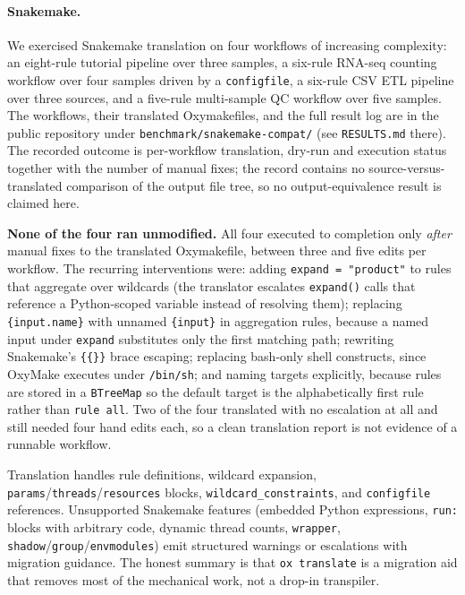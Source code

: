 \documentclass[12pt,a4paper]{article}
\newcommand{\code}[1]{{\texttt{\small\color{inlinecode}#1}}}
\begin{document}
\paragraph{Snakemake.}
We exercised Snakemake translation on four workflows of increasing
complexity: an eight-rule tutorial pipeline over three samples, a
six-rule RNA-seq counting workflow over four samples driven by a
\code{configfile}, a six-rule CSV ETL pipeline over three sources, and a
five-rule multi-sample QC workflow over five samples. The workflows, their
translated Oxymakefiles, and the full result log are in the public
repository under \code{benchmark/snakemake-compat/} (see
\code{RESULTS.md} there). The recorded outcome is per-workflow
translation, dry-run and execution status together with the number of
manual fixes; the record contains no source-versus-translated comparison
of the output file tree, so no output-equivalence result is claimed
here.

\textbf{None of the four ran unmodified.} All four executed to completion
only \emph{after} manual fixes to the translated Oxymakefile, between
three and five edits per workflow. The recurring interventions were:
adding \code{expand = "product"} to rules that aggregate over wildcards
(the translator escalates \code{expand()} calls that reference a
Python-scoped variable instead of resolving them); replacing
\code{\{input.name\}} with unnamed \code{\{input\}} in aggregation rules,
because a named input under \code{expand} substitutes only the first
matching path; rewriting Snakemake's \code{\{\{\}\}} brace escaping;
replacing bash-only shell constructs, since OxyMake executes under
\code{/bin/sh}; and naming targets explicitly, because rules are stored in
a \code{BTreeMap} so the default target is the alphabetically first rule
rather than \code{rule all}. Two of the four translated with no escalation
at all and still needed four hand edits each, so a clean translation
report is not evidence of a runnable workflow.

Translation handles rule definitions, wildcard expansion,
\code{params}/\code{threads}/\code{resources} blocks,
\code{wildcard\_constraints}, and \code{configfile} references.
Unsupported Snakemake features (embedded Python expressions, \code{run:}
blocks with arbitrary code, dynamic thread counts, \code{wrapper},
\code{shadow}/\code{group}/\code{envmodules}) emit structured warnings or
escalations with migration guidance. The honest summary is that
\code{ox translate} is a migration aid that removes most of the mechanical
work, not a drop-in transpiler.
\end{document}
